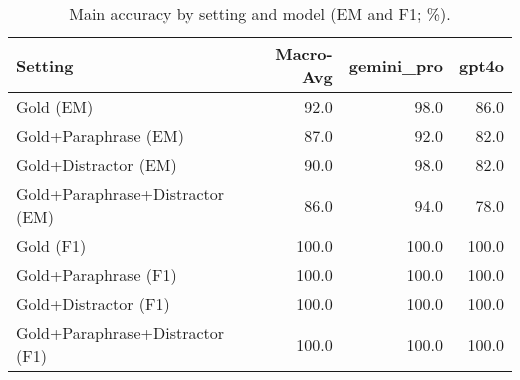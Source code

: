 \begin{table}[t]\centering
\caption{Main accuracy by setting and model (EM and F1; \%).}
\label{tab:main-accuracy}
\begin{tabular}{lrrr}
\toprule
Setting & Macro-Avg & gemini_pro & gpt4o \\
\midrule
Gold (EM) & 92.0 & 98.0 & 86.0 \\
Gold+Paraphrase (EM) & 87.0 & 92.0 & 82.0 \\
Gold+Distractor (EM) & 90.0 & 98.0 & 82.0 \\
Gold+Paraphrase+Distractor (EM) & 86.0 & 94.0 & 78.0 \\
Gold (F1) & 100.0 & 100.0 & 100.0 \\
Gold+Paraphrase (F1) & 100.0 & 100.0 & 100.0 \\
Gold+Distractor (F1) & 100.0 & 100.0 & 100.0 \\
Gold+Paraphrase+Distractor (F1) & 100.0 & 100.0 & 100.0 \\
\bottomrule
\end{tabular}
\end{table}
